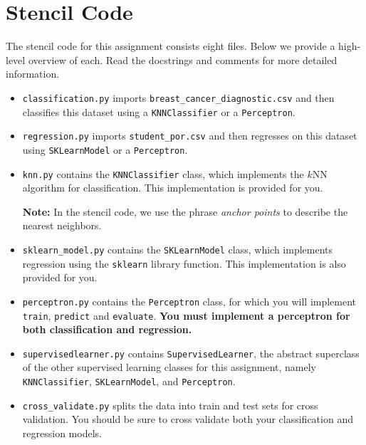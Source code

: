 \documentclass{article}
\begin{document}
\section{Stencil Code}
The stencil code for this assignment consists eight files.
Below we provide a high-level overview of each.
Read the docstrings and comments for more detailed information.

\begin{itemize}
\item \verb|classification.py| imports \verb|breast_cancer_diagnostic.csv|
  and then classifies this dataset using a \verb|KNNClassifier| or a \verb|Perceptron|.

\item \verb|regression.py| imports \verb|student_por.csv| and then regresses
  on this dataset using \verb|SKLearnModel| or a \verb|Perceptron|.

\item \verb|knn.py| contains the \verb|KNNClassifier| class,
  which implements the $k$NN algorithm for classification.
  This implementation is provided for you.

  \textbf{Note:} In the stencil code, we use the phrase \emph{anchor points} to describe the nearest neighbors.

\item \verb|sklearn_model.py| contains the \verb|SKLearnModel| class,
  which implements regression using the \verb|sklearn| library function.
  This implementation is also provided for you.

\item \verb|perceptron.py| contains the \verb|Perceptron| class,
  for which you will implement \verb|train|, \verb|predict| and \verb|evaluate|.
  \textbf{You must implement a perceptron for both classification and regression.}

\item \verb|supervisedlearner.py| contains \verb|SupervisedLearner|,
  the abstract superclass of the other supervised learning classes for
  this assignment, namely \verb|KNNClassifier|, \verb|SKLearnModel|, and \verb|Perceptron|.

\item \verb|cross_validate.py| splits the data into train and test sets for cross validation.
  You should be sure to cross validate both your classification and regression models.
\end{itemize}
\end{document}

